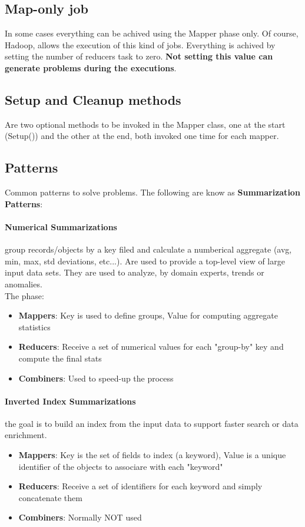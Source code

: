 \documentclass[12pt]{article}
\begin{document}
\subsection{Map-only job}
In some cases everything can be achived using the Mapper phase only. Of course, Hadoop, allows the execution of this kind of jobs. Everything is achived by setting the number of reducers task to zero. \textbf{Not setting this value can generate problems during the executions}.

\subsection{Setup and Cleanup methods}
Are two optional methods to be invoked in the Mapper class, one at the start (Setup()) and the other at the end, both invoked one time for each mapper.

\subsection{Patterns}
Common patterns to solve problems. The following are know as \textbf{Summarization Patterns}:
\paragraph{Numerical Summarizations} group records/objects by a key filed and calculate a numberical aggregate (avg, min, max, std deviations, etc...). Are used to provide a top-level view of large input data sets. They are used to analyze, by domain experts, trends or anomalies.\\
The phase:
\begin{itemize}
  \item \textbf{Mappers}: Key is used to define groups, Value for computing aggregate statistics
  \item \textbf{Reducers}: Receive a set of numerical values for each "group-by" key and compute the final stats
  \item \textbf{Combiners}: Used to speed-up the process
\end{itemize}

\paragraph{Inverted Index Summarizations} the goal is to build an index from the input data to support faster search or data enrichment.
\begin{itemize}
  \item \textbf{Mappers}: Key is the set of fields to index (a keyword), Value is a unique identifier of the objects to associare with each "keyword"
  \item \textbf{Reducers}: Receive a set of identifiers for each keyword and simply concatenate them
  \item \textbf{Combiners}: Normally NOT used
\end{itemize}
\end{document}
